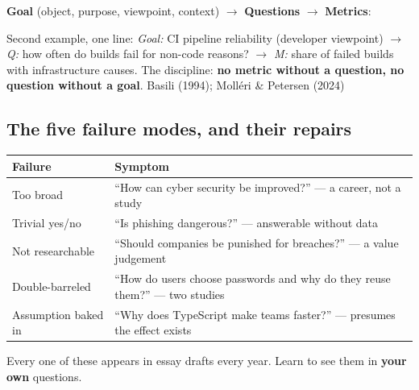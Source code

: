 \documentclass[11pt,a4paper,british,twoside=false,headings=small,chapterprefix=false,numbers=noenddot]{scrbook}
\begin{document}
\begin{center}\small
\small \textbf{Goal} (object, purpose, viewpoint, context) $\rightarrow$
  \textbf{Questions} $\rightarrow$ \textbf{Metrics}:
  \begin{center}
  \end{center}
  \footnotesize Second example, one line: \emph{Goal:} CI pipeline
  reliability (developer viewpoint) $\rightarrow$ \emph{Q:} how often do
  builds fail for non-code reasons? $\rightarrow$ \emph{M:} share of failed
  builds with infrastructure causes. The discipline: \textbf{no metric
  without a question, no question without a goal}.
  \hfill {\color{kgrey}\scriptsize Basili (1994); Molléri \& Petersen (2024)}
\end{center}


\subsection{The five failure modes, and their repairs}
\begin{center}\small
\small
  \renewcommand{\arraystretch}{1.35}
  \begin{tabular}{@{}p{3.3cm}p{9.9cm}@{}}
    \toprule
    \textbf{Failure} & \textbf{Symptom}\\
    \midrule
    Too broad & ``How can cyber security be improved?'' --- a career, not a study\\
    Trivial yes/no & ``Is phishing dangerous?'' --- answerable without data\\
    Not researchable & ``Should companies be punished for breaches?'' --- a value judgement\\
    Double-barreled & ``How do users choose passwords and why do they reuse them?'' --- two studies\\
    Assumption baked in & ``Why does TypeScript make teams faster?'' --- presumes the effect exists\\
    \bottomrule
  \end{tabular}
  

  Every one of these appears in essay drafts every year. Learn to see them
  in \textbf{your own} questions.
\end{center}
\end{document}
